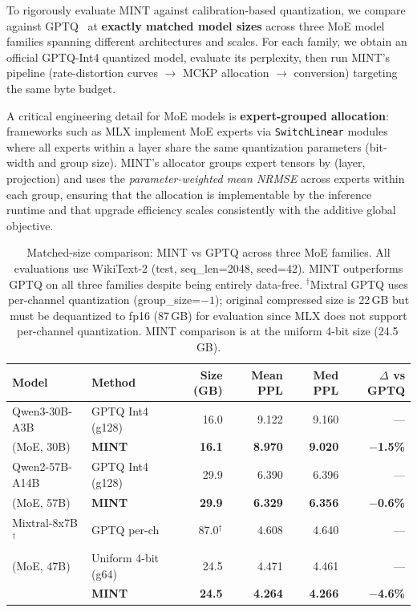 \documentclass{article}
\begin{document}
To rigorously evaluate MINT against calibration-based quantization, we compare against GPTQ~\cite{frantar2023gptq} at \textbf{exactly matched model sizes} across three MoE model families spanning different architectures and scales. For each family, we obtain an official GPTQ-Int4 quantized model, evaluate its perplexity, then run MINT's pipeline (rate-distortion curves $\rightarrow$ MCKP allocation $\rightarrow$ conversion) targeting the same byte budget.

A critical engineering detail for MoE models is \textbf{expert-grouped allocation}: frameworks such as MLX implement MoE experts via \texttt{SwitchLinear} modules where all experts within a layer share the same quantization parameters (bit-width and group size). MINT's allocator groups expert tensors by (layer, projection) and uses the \emph{parameter-weighted mean NRMSE} across experts within each group, ensuring that the allocation is implementable by the inference runtime and that upgrade efficiency scales consistently with the additive global objective.

\begin{table}[h]
\centering
\caption{Matched-size comparison: MINT vs GPTQ across three MoE families. All evaluations use WikiText-2 (test, seq\_len=2048, seed=42). MINT outperforms GPTQ on all three families despite being entirely data-free. $^\dagger$Mixtral GPTQ uses per-channel quantization (group\_size=$-1$); original compressed size is 22\,GB but must be dequantized to fp16 (87\,GB) for evaluation since MLX does not support per-channel quantization. MINT comparison is at the uniform 4-bit size (24.5\,GB).}
\label{tab:gptq_comparison}
\begin{tabular}{llrrrr}
\toprule
Model & Method & Size (GB) & Mean PPL & Med PPL & $\Delta$ vs GPTQ \\
\midrule
Qwen3-30B-A3B & GPTQ Int4 (g128) & 16.0 & 9.122 & 9.160 & --- \\
(MoE, 30B) & \textbf{MINT} & \textbf{16.1} & \textbf{8.970} & \textbf{9.020} & \textbf{$-$1.5\%} \\
\midrule
Qwen2-57B-A14B & GPTQ Int4 (g128) & 29.9 & 6.390 & 6.396 & --- \\
(MoE, 57B) & \textbf{MINT} & \textbf{29.9} & \textbf{6.329} & \textbf{6.356} & \textbf{$-$0.6\%} \\
\midrule
Mixtral-8x7B$^\dagger$ & GPTQ per-ch & 87.0$^\dagger$ & 4.608 & 4.640 & --- \\
(MoE, 47B) & Uniform 4-bit (g64) & 24.5 & 4.471 & 4.461 & --- \\
 & \textbf{MINT} & \textbf{24.5} & \textbf{4.264} & \textbf{4.266} & \textbf{$-$4.6\%} \\
\bottomrule
\end{tabular}
\end{table}
\end{document}
